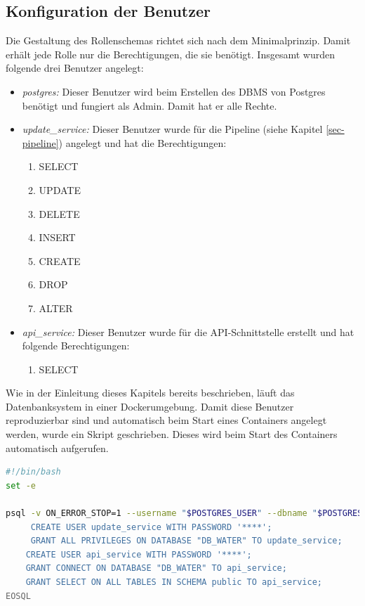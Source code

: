 \subsection{Konfiguration der Benutzer} 
Die Gestaltung des Rollenschemas richtet sich nach dem Minimalprinzip. Damit erhält jede Rolle nur die Berechtigungen, die sie benötigt. Insgesamt wurden folgende drei Benutzer angelegt:
\begin{itemize}
    \item \textit{postgres:} Dieser Benutzer wird beim Erstellen des DBMS von Postgres benötigt und fungiert als Admin. Damit hat er alle Rechte.
    \item \textit{update\_service:} Dieser Benutzer wurde für die Pipeline (siehe Kapitel \ref{sec-pipeline}) angelegt und hat die Berechtigungen:
    \begin{enumerate}[label=(\alph*)]
        \item SELECT
        \item UPDATE
        \item DELETE
        \item INSERT
        \item CREATE
        \item DROP
        \item ALTER
    \end{enumerate}
    \item \textit{api\_service:} Dieser Benutzer wurde für die API-Schnittstelle erstellt und hat folgende Berechtigungen:
    \begin{enumerate}[label=(\alph*)]
        \item SELECT
    \end{enumerate}
\end{itemize}
Wie in der Einleitung dieses Kapitels bereits beschrieben, läuft das Datenbanksystem in einer Dockerumgebung. Damit diese Benutzer reproduzierbar sind und automatisch beim
Start eines Containers angelegt werden, wurde ein Skript geschrieben. Dieses wird beim Start des Containers automatisch aufgerufen.
~\\
\begin{lstlisting}[language={bash}, caption={Bash zum Erstellen der SQL-Nutzer}, captionpos=b, label={list-trigger}]
#!/bin/bash
set -e

psql -v ON_ERROR_STOP=1 --username "$POSTGRES_USER" --dbname "$POSTGRES_DB" <<-EOSQL
	 CREATE USER update_service WITH PASSWORD '****';
	 GRANT ALL PRIVILEGES ON DATABASE "DB_WATER" TO update_service;
    CREATE USER api_service WITH PASSWORD '****';
    GRANT CONNECT ON DATABASE "DB_WATER" TO api_service;
    GRANT SELECT ON ALL TABLES IN SCHEMA public TO api_service;
EOSQL
\end{lstlisting}
